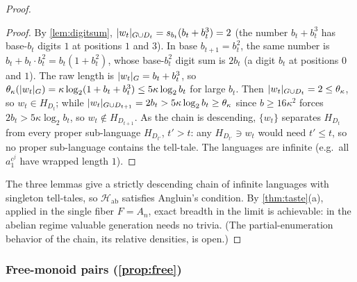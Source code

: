 \documentclass[11pt]{article}
\numberwithin{equation}{section}
\newcommand{\mc}[1]{\mathcal{#1}}
\DeclarePairedDelimiter{\abs}{\lvert}{\rvert}
\newcommand{\Amb}{F}
\newcommand{\Hcal}{\mc{H}}
\newcommand{\Comp}[1]{H_{#1}}
\theoremstyle{plain}
\theoremstyle{definition}
\theoremstyle{remark}
\begin{document}
\begin{proof}
\begin{proof}
By \cref{lem:digitsum}, $\abs{w_t}_{G \cup D_t} = s_{b_t}(b_t + b_t^3) = 2$ (the number $b_t +
b_t^3$ has base-$b_t$ digits $1$ at positions $1$ and $3$). In base $b_{t+1} = b_t^2$, the
same number is $b_t + b_t \cdot b_t^2 = b_t(1 + b_t^2)$, whose base-$b_t^2$ digit sum is $2
b_t$ (a digit $b_t$ at positions $0$ and $1$). The raw length is $\abs{w_t}_G = b_t + b_t^3$,
so $\theta_\kappa(\abs{w_t}_G) = \kappa \log_2(1 + b_t + b_t^3) \le 5\kappa \log_2 b_t$ for
large $b_t$. Then $\abs{w_t}_{G \cup D_t} = 2 \le \theta_\kappa$, so $w_t \in \Comp{D_t}$;
while $\abs{w_t}_{G \cup D_{t+1}} = 2 b_t > 5\kappa \log_2 b_t \ge \theta_\kappa$ since $b \ge
16\kappa^2$ forces $2 b_t > 5\kappa \log_2 b_t$, so $w_t \notin \Comp{D_{t+1}}$. As the chain
is descending, $\{w_t\}$ separates $\Comp{D_t}$ from every proper sub-language
$\Comp{D_{t'}}$, $t' > t$: any $\Comp{D_{t'}} \ni w_t$ would need $t' \le t$, so no proper
sub-language contains the tell-tale. The languages are infinite (e.g.\ all $a_1^{c^j}$ have
wrapped length $1$).
\end{proof}

The three lemmas give a strictly descending chain of infinite languages with singleton
tell-tales, so $\Hcal_{\mathrm{ab}}$ satisfies Angluin's condition. By \cref{thm:taste}(a),
applied in the single fiber $\Amb = A_n$, exact breadth in the limit is achievable: in the
abelian regime valuable generation needs no trivia. (The partial-enumeration behavior of the
chain, its relative densities, is open.)
\end{proof}

\subsubsection{Free-monoid pairs (\texorpdfstring{\cref{prop:free}}{Proposition 8})}
\end{document}

